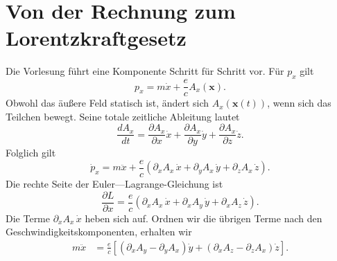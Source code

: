 \begin{classroomqa}
\end{classroomqa}

\section{Von der Rechnung zum Lorentzkraftgesetz}

Die Vorlesung führt eine Komponente Schritt für Schritt vor. Für \(p_x\) gilt
\begin{equation}
  p_x=m\dot x+\frac{e}{c}A_x(\mathbf x).
\end{equation}
Obwohl das äußere Feld statisch ist, ändert sich \(A_x(\mathbf x(t))\), wenn sich das Teilchen bewegt. Seine totale zeitliche Ableitung lautet
\begin{equation}
  \frac{dA_x}{dt}
  =
  \frac{\partial A_x}{\partial x}\dot x
  +
  \frac{\partial A_x}{\partial y}\dot y
  +
  \frac{\partial A_x}{\partial z}\dot z.
\end{equation}
Folglich gilt
\begin{equation}
  \dot p_x
  =
  m\ddot x
  +
  \frac{e}{c}
  \left(
    \partial_xA_x\,\dot x
    +
    \partial_yA_x\,\dot y
    +
    \partial_zA_x\,\dot z
  \right).
\end{equation}
Die rechte Seite der Euler---Lagrange-Gleichung ist
\begin{equation}
  \frac{\partial L}{\partial x}
  =
  \frac{e}{c}
  \left(
    \partial_xA_x\,\dot x
    +
    \partial_xA_y\,\dot y
    +
    \partial_xA_z\,\dot z
  \right).
\end{equation}
Die Terme \(\partial_xA_x\,\dot x\) heben sich auf. Ordnen wir die übrigen Terme nach den Geschwindigkeitskomponenten, erhalten wir
\begin{align}
  m\ddot x
  &=
  \frac{e}{c}
  \left[
    \left(\partial_xA_y-\partial_yA_x\right)\dot y
    +
    \left(\partial_xA_z-\partial_zA_x\right)\dot z
  \right].
\end{align}

